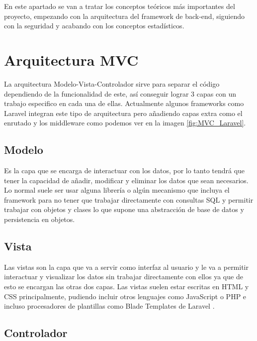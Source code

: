
En este apartado se van a tratar los conceptos teóricos más importantes del proyecto, empezando con la arquitectura del framework de back-end, siguiendo con la seguridad y acabando con los conceptos estadísticos. 

\section{Arquitectura MVC}\label{MVC}

La arquitectura Modelo-Vista-Controlador sirve para separar el código dependiendo de la funcionalidad de este, así conseguir lograr 3 capas con un trabajo especifico en cada una de ellas\cite{MVC}. Actualmente algunos frameworks como Laravel integran este tipo de arquitectura pero añadiendo capas extra como el enrutado y los middleware como podemos ver en la imagen \ref{fig:MVC_Laravel}.


\subsection{Modelo}

Es la capa que se encarga de interactuar con los datos, por lo tanto tendrá que tener la capacidad de añadir, modificar y eliminar los datos que sean necesarios. Lo normal suele ser usar alguna librería o algún mecanismo que incluya el framework para no tener que trabajar directamente con consultas SQL y permitir trabajar con objetos y clases lo que supone una abstracción de base de datos y persistencia en objetos\cite{MVC}.

\subsection{Vista}

Las vistas son la capa que va a servir como interfaz al usuario y le va a permitir interactuar y visualizar los datos sin trabajar directamente con ellos ya que de esto se encargan las otras dos capas. Las vistas suelen estar escritas en HTML y CSS principalmente, pudiendo incluir otros lenguajes como JavaScript o PHP e incluso procesadores de plantillas como Blade Templates de Laravel \cite{MVC}.

\subsection{Controlador}

